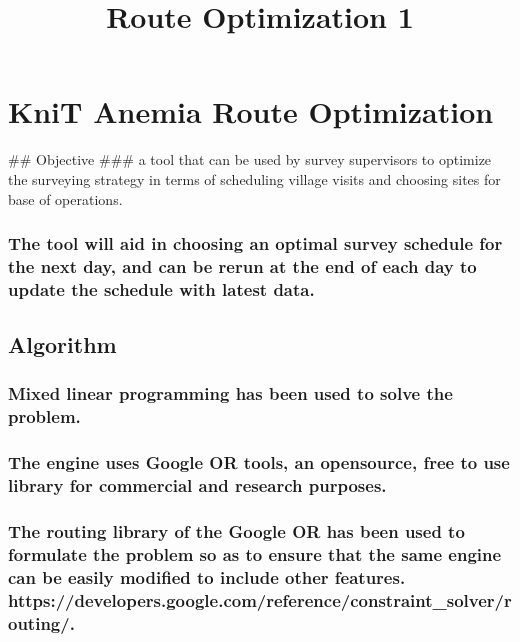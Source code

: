 \documentclass[11pt]{article}
\title{Route Optimization 1}
\begin{document}
    
    
    \maketitle
    
    

    
    \section{KniT Anemia Route
Optimization}\label{knit-anemia-route-optimization}

    \#\# Objective \#\#\# a tool that can be used by survey supervisors to
optimize the surveying strategy in terms of scheduling village visits
and choosing sites for base of operations.

\subsubsection{The tool will aid in choosing an optimal survey schedule
for the next day, and can be rerun at the end of each day to update the
schedule with latest
data.}\label{the-tool-will-aid-in-choosing-an-optimal-survey-schedule-for-the-next-day-and-can-be-rerun-at-the-end-of-each-day-to-update-the-schedule-with-latest-data.}

    \subsection{Algorithm}\label{algorithm}

\subsubsection{Mixed linear programming has been used to solve the
problem.}\label{mixed-linear-programming-has-been-used-to-solve-the-problem.}

\subsubsection{The engine uses Google OR tools, an opensource, free to
use library for commercial and research
purposes.}\label{the-engine-uses-google-or-tools-an-opensource-free-to-use-library-for-commercial-and-research-purposes.}

\subsubsection{The routing library of the Google OR has been used to
formulate the problem so as to ensure that the same engine can be easily
modified to include other features.
https://developers.google.com/reference/constraint\_solver/routing/.}\label{the-routing-library-of-the-google-or-has-been-used-to-formulate-the-problem-so-as-to-ensure-that-the-same-engine-can-be-easily-modified-to-include-other-features.-httpsdevelopers.google.comreferenceconstraint_solverrouting.}
\end{document}
